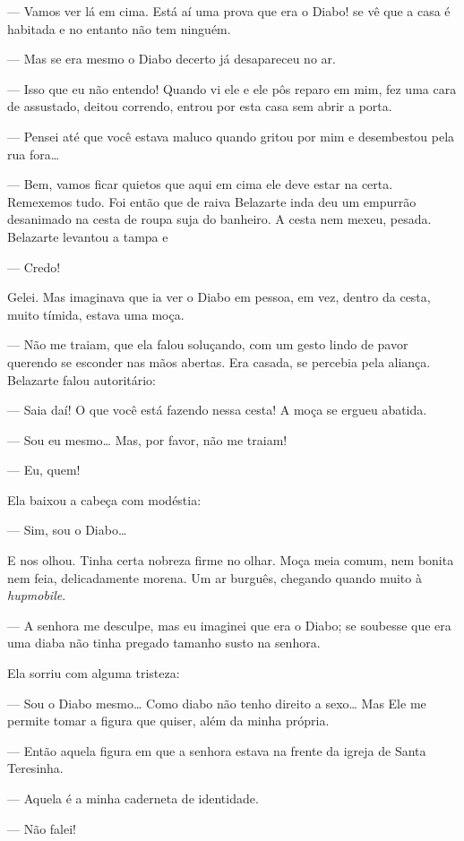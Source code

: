 --- Vamos ver lá em cima. Está aí uma prova que era o Diabo! se vê que a
casa é habitada e no entanto não tem ninguém.

--- Mas se era mesmo o Diabo decerto já desapareceu no ar.

--- Isso que eu não entendo! Quando vi ele e ele pôs reparo em mim, fez
uma cara de assustado, deitou correndo, entrou por esta casa sem abrir a
porta.

--- Pensei até que você estava maluco quando gritou por mim e
desembestou pela rua fora\ldots{}

--- Bem, vamos ficar quietos que aqui em cima ele deve estar na certa.
Remexemos tudo. Foi então que de raiva Belazarte inda deu um empurrão
desanimado na cesta de roupa suja do banheiro. A cesta nem mexeu,
pesada. Belazarte levantou a tampa e

--- Credo!

Gelei. Mas imaginava que ia ver o Diabo em pessoa, em vez, dentro da
cesta, muito tímida, estava uma moça.

--- Não me traiam, que ela falou soluçando, com um gesto lindo de pavor
querendo se esconder nas mãos abertas. Era casada, se percebia pela
aliança. Belazarte falou autoritário:

--- Saia daí! O que você está fazendo nessa cesta! A moça se ergueu
abatida.

--- Sou eu mesmo\ldots{} Mas, por favor, não me traiam!

--- Eu, quem!

Ela baixou a cabeça com modéstia:

--- Sim, sou o Diabo\ldots{}

E nos olhou. Tinha certa nobreza firme no olhar. Moça meia comum, nem
bonita nem feia, delicadamente morena. Um ar burguês, chegando quando
muito à \emph{hupmobile}.

--- A senhora me desculpe, mas eu imaginei que era o Diabo; se soubesse
que era uma diaba não tinha pregado tamanho susto na senhora.

Ela sorriu com alguma tristeza:

--- Sou o Diabo mesmo\ldots{} Como diabo não tenho direito a sexo\ldots{} Mas Ele
me permite tomar a figura que quiser, além da minha própria.

--- Então aquela figura em que a senhora estava na frente da igreja de
Santa Teresinha.

--- Aquela é a minha caderneta de identidade.

--- Não falei!

